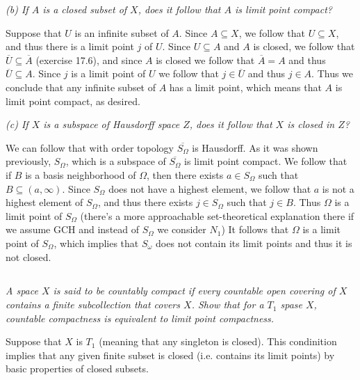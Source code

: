 \documentclass[11pt,oneside,titlepage]{book}
\begin{document}
\textit{(b) If $A$ is a closed subset of $X$, does it follow that $A$ is limit point
  compact?}


Suppose that $U$ is an infinite subset of $A$. Since $A \subseteq X$, we follow that
$U \subseteq X$, and thus there is a limit point $j$ of $U$. Since $U \subseteq A$
and $A$ is closed, we follow that $\overline{U} \subseteq \overline{A}$ (exercise 17.6),
and since $A$ is closed we follow that $\overline{A} = A$ and thus $\overline{U} \subseteq A$.
Since $j$ is a limit point of $U$ we follow that $j \in \overline{U}$ and thus $j \in A$.
Thus we conclude that any infinite subset of $A$ has a limit point, which means that
$A$ is limit point compact, as desired.

\textit{(c) If $X$ is a subspace of Hausdorff space $Z$, does it follow that $X$ is closed
  in $Z$?}

We can follow that with order topology $\overline{S_\Omega}$ is Hausdorff. As it was shown
previously, $S_\Omega$, which is a subspace of $\overline{S_\Omega}$ is limit point compact.
We follow that if $B$ is a basis neighborhood of $\Omega$, then there exists $a \in S_\Omega$
such that $B \subseteq (a, \infty)$. Since $S_\Omega$ does not have a highest element,
we follow that $a$ is not a highest element of $S_\Omega$, and thus there exists
$j \in S_\Omega$ such that $j \in B$. Thus $\Omega$ is a limit point of $S_\Omega$ (there's
a more approachable set-theoretical explanation there if we assume GCH and instead of $S_\Omega$ we
consider $N_1$) It follows that $\Omega$ is a limit point of $S_\Omega$,
which implies that $S_\omega$ does not contain its limit points and thus it is not closed.

\subsection{}

\textit{A space $X$ is said to be countably compact if every countable open covering
  of $X$ contains a finite subcollection that covers $X$. Show that for a $T_1$ spase $X$,
  countable compactness is equivalent to limit point compactness.}

Suppose that $X$ is $T_1$ (meaning that any singleton is closed). This condinition
implies that any given finite subset is closed (i.e. contains its limit points) by
basic properties of closed subsets.
\end{document}
